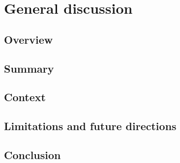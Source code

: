 \chapter{General discussion}

\clearpage
\section{Overview}
\lipsum[1-1]

\section{Summary}
\lipsum[1-2]

\section{Context}
\lipsum[1-3]

\section{Limitations and future directions}
\lipsum[1-4]

\section{Conclusion}
\lipsum[1-5]
\cite{Lakatos1970}

\clearpage
\printbibliography[heading=subbibnumbered, title={References}]

